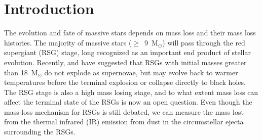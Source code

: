 \documentclass[modern]{aastex61}
\newcommand{\SOFIA}{{\it SOFIA}}
\begin{document}
\author{William F. Hoffman}



\begin{abstract}
  New MMT/MIRAC (9--11~\micron), \SOFIA/FORCAST (11--37~\micron), and Herschel/PACS (70 and 160~\micron) infrared (IR) imaging and photometry is presented for three famous OH/IR red supergiants (NML~Cyg, VX~Sgr, and S~Per) and two normal red supergiants (RS~Per and T~Per). We model the observed spectral energy distributions (SEDs) using radiative transfer code DUSTY. Azimuthal average profiles from the \SOFIA/FORCAST imaging, in addition to dust mass distribution profiles from DUSTY, constrain the mass-loss histories of these supergiants. For all of our observed supergiants, the DUSTY models suggest that constant mass-loss rates do not produce enough dust to explain the observed infrared emission in the stars' SEDs. Combining our results with \cite{shenoy2016} (Paper~I) we find mixed results with some red supergiants showing evidence for variable and high mass-loss events while others have constant mass loss over the past few thousand years.
\end{abstract}


\section{Introduction}
The evolution and fate  of massive stars depends on mass loss and their mass loss histories. The majority of massive stars ($\ge$~9~M$_{\odot}$) will pass through the red supergiant (RSG) stage, long recognized as an important end product of stellar evolution. Recently, \cite{smartt2009} and \cite{smartt2015} have suggested that RSGs with initial masses greater than 18~M$_{\odot}$ do not explode as supernovae, but may evolve back to warmer temperatures before the terminal explosion or collapse directly to black holes. The RSG stage is also a high mass losing stage, and to what extent mass loss can affect the terminal state of the RSGs is now an open question. Even though the mass-loss mechanism for RSGs is still debated, we can measure the mass lost from the thermal infrared (IR) emission from dust in the circumstellar ejecta surrounding the RSGs.
\end{document}
